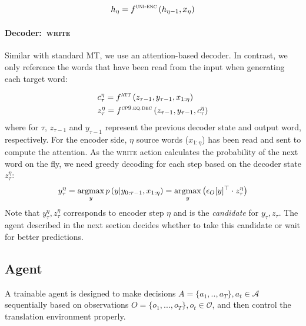 \begin{equation}
\label{cp9.eq.enc}
    h_{\eta} = f^{\textsc{uni-enc}}\left(h_{\eta-1}, x_{\eta}\right)
\end{equation}

\paragraph{Decoder:~\textsc{write}} Similar with standard MT, we use an attention-based decoder. In contrast, we only reference the words that have been read from the input when generating each target word:

\begin{equation}
\label{cp9.eq.dec}
    \begin{split}
        &c_{\tau}^{\eta} = f^{\textsc{att}}\left(z_{\tau-1}, y_{\tau-1}, x_{1:\eta}\right) \\
        &z_{\tau}^{\eta} = f^{\textsc{cp9.eq.dec}}\left(z_{\tau-1}, y_{\tau-1}, c_{\tau}^{\eta}\right)
    \end{split}
\end{equation}
where for $\tau$, $z_{\tau-1}$ and $y_{\tau-1}$ represent the previous decoder state and output word, respectively. For the encoder side, $\eta$ source words ($x_{1:\eta}$) has been read and sent to compute the attention.
As the \textsc{write} action calculates the probability of the next word on the fly, we need greedy decoding for each step based on the decoder state $z_\tau^\eta$:
\begin{equation}
    y_{\tau}^{\eta} = \mathop{\text{argmax}}_{y}p\left(y|y_{0:\tau-1}, x_{1:\eta}\right) = \mathop{\text{argmax}}_{y} \left(\epsilon_O[y]^\top \cdot z^\eta_\tau \right)
\end{equation}
Note that $y_{\tau}^{\eta}, z_{\tau}^{\eta}$ corresponds to encoder step $\eta$ and is the {\it candidate} for $y_{\tau}, z_{\tau}$.
The agent described in the next section decides whether to take this candidate or wait for better predictions.

\subsection{Agent}
\label{cp9.sec.agent}
A trainable agent is designed to make decisions $A=\{a_1, .., a_T\}, a_t \in \mathcal{A}$ sequentially based on observations $O=\{o_1, ..., o_T\}, o_t \in \mathcal{O}$, and then control the translation environment properly. %
